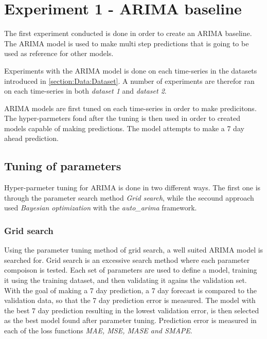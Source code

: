
\section{Experiment 1 - ARIMA baseline}
\label{section:Method:Experiment1}
The first experiment conducted is done in order to create an ARIMA baseline.
The ARIMA model is used to make multi step predictions that is going to be used as reference for other models.

Experiments with the ARIMA model is done on each time-series in the datasets introduced in \cref{section:Data:Dataset}.
A number of experiments are therefor ran on each time-series in both \textit{dataset 1} and \textit{dataset 2}.

ARIMA models are first tuned on each time-series in order to make predicitons.
The hyper-parmeters fond after the tuning is then used in order to created models capable of making predictions.
The model attempts to make a 7 day ahead prediction.


\subsection{Tuning of parameters}
Hyper-parmeter tuning for ARIMA is done in two different ways.
The first one is through the parameter search method \textit{Grid search},
while the secound approach used \textit{Bayesian optimization} with the \textit{auto_arima} framework.

\subsubsection*{Grid search}
Using the parameter tuning method of grid search, a well suited ARIMA model is searched for.
Grid search is an excessive search method where each parameter compoison is tested.
Each set of parameters are  used to define a model, training it using the training dataset,
and then validating it agains the validation set.
With the goal of making a 7 day prediction, a 7 day forecast is compared to the validation data,
so that the 7 day prediction error is measured.
The model with the best 7 day prediction resulting in the lowest validation error,
is then selected as the best model found after parameter tuning.
Prediction error is measured in each of the loss functions \textit{MAE, MSE, MASE and SMAPE}.

